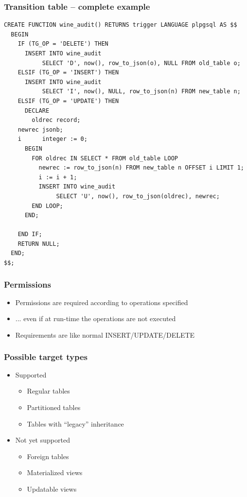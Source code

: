 \documentclass[ignorenonframetext,t]{beamer}
\begin{document}
\begin{frame}[fragile]
  \frametitle{Transition table -- complete example}
  \begin{lstlisting}[basicstyle=\tiny]
CREATE FUNCTION wine_audit() RETURNS trigger LANGUAGE plpgsql AS $$
  BEGIN
    IF (TG_OP = 'DELETE') THEN
      INSERT INTO wine_audit
           SELECT 'D', now(), row_to_json(o), NULL FROM old_table o;
    ELSIF (TG_OP = 'INSERT') THEN
      INSERT INTO wine_audit
           SELECT 'I', now(), NULL, row_to_json(n) FROM new_table n;
    ELSIF (TG_OP = 'UPDATE') THEN
      DECLARE
        oldrec record;
	newrec jsonb;
	i      integer := 0;
      BEGIN
        FOR oldrec IN SELECT * FROM old_table LOOP
          newrec := row_to_json(n) FROM new_table n OFFSET i LIMIT 1;
          i := i + 1;
          INSERT INTO wine_audit
               SELECT 'U', now(), row_to_json(oldrec), newrec;
        END LOOP;
      END;

    END IF;
    RETURN NULL;
  END;
$$;

  \end{lstlisting}
\end{frame}

\begin{frame}
  \frametitle{Permissions}

  \begin{itemize}
    \item Permissions are required according to operations specified
    \item ... even if at run-time the operations are not executed
    \item Requirements are like normal INSERT/UPDATE/DELETE
  \end{itemize}
\end{frame}

\begin{frame}
  \frametitle{Possible target types}

  \begin{itemize}
    \item Supported
      \begin{itemize}
	\item Regular tables
	\item Partitioned tables
	\item Tables with ``legacy'' inheritance
      \end{itemize}
      \pause
    \item Not yet supported
      \begin{itemize}
	\item Foreign tables
	\item Materialized views
	\item Updatable views
      \end{itemize}
  \end{itemize}
\end{frame}
\end{document}
